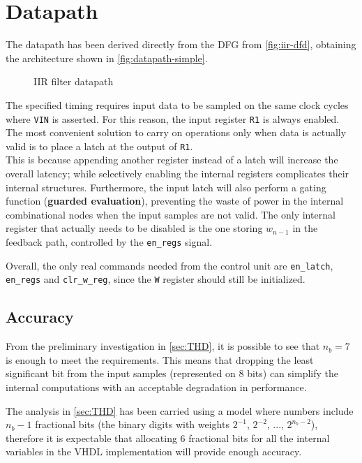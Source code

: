 \section{Datapath}
The datapath has been derived directly from the DFG from \autoref{fig:iir-dfd}, obtaining the architecture shown in \autoref{fig:datapath-simple}.

\begin{figure}[htbp]
	\centering
	\caption{IIR filter datapath}
	\label{fig:datapath-simple}
\end{figure}

The specified timing requires input data to be sampled on the same clock cycles where \texttt{VIN} is asserted. For this reason, the input register \texttt{R1} is always enabled. The most convenient solution to carry on operations only when data is actually valid is to place a latch at the output of \texttt{R1}.\\
This is because appending another register instead of a latch will increase the overall latency; while selectively enabling the internal registers complicates their internal structures. Furthermore, the input latch will also perform a gating function (\textbf{guarded evaluation}), preventing the waste of power in the internal combinational nodes when the input samples are not valid. The only internal register that actually needs to be disabled is the one storing $w_{n-1}$ in the feedback path, controlled by the \texttt{en\_regs} signal.

Overall, the only real commands needed from the control unit are \texttt{en\_latch}, \texttt{en\_regs} and \texttt{clr\_w\_reg}, since the \texttt{W} register should still be initialized.

\subsection{Accuracy}
From the preliminary investigation in \autoref{sec:THD}, it is possible to see that $n_b=7$ is enough to meet the requirements. This means that dropping the least significant bit from the input samples (represented on 8 bits) can simplify the internal computations with an acceptable degradation in performance.

The analysis in \autoref{sec:THD} has been carried using a model where numbers include $n_b-1$ fractional bits (the binary digits with weights $2^{-1}$, $2^{-2}$, ..., $2^{n_b-2}$), therefore it is expectable that allocating 6 fractional bits for all the internal variables in the VHDL implementation will provide enough accuracy.

